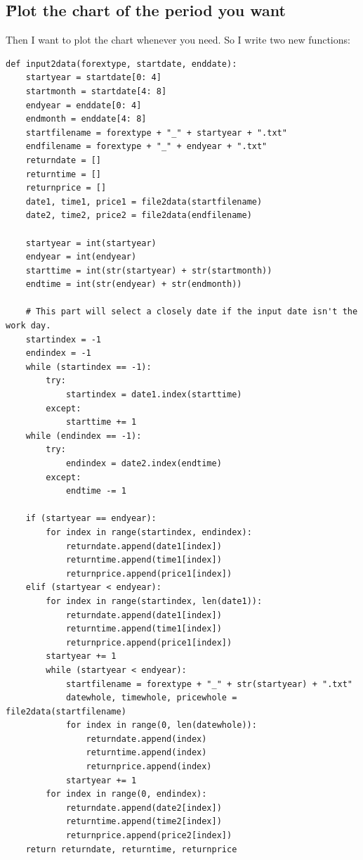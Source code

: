 \documentclass[12pt]{article}
\begin{document}
\subsection{\H Plot the chart of the period you want}
Then I want to plot the chart whenever you need. So I write two new functions:
\begin{lstlisting}
def input2data(forextype, startdate, enddate):
    startyear = startdate[0: 4]
    startmonth = startdate[4: 8]
    endyear = enddate[0: 4]
    endmonth = enddate[4: 8]
    startfilename = forextype + "_" + startyear + ".txt"
    endfilename = forextype + "_" + endyear + ".txt"
    returndate = []
    returntime = []
    returnprice = []
    date1, time1, price1 = file2data(startfilename)
    date2, time2, price2 = file2data(endfilename)

    startyear = int(startyear)
    endyear = int(endyear)
    starttime = int(str(startyear) + str(startmonth))
    endtime = int(str(endyear) + str(endmonth))

    # This part will select a closely date if the input date isn't the work day.
    startindex = -1
    endindex = -1
    while (startindex == -1):
        try:
            startindex = date1.index(starttime)
        except:
            starttime += 1
    while (endindex == -1):
        try:
            endindex = date2.index(endtime)
        except:
            endtime -= 1

    if (startyear == endyear):
        for index in range(startindex, endindex):
            returndate.append(date1[index])
            returntime.append(time1[index])
            returnprice.append(price1[index])
    elif (startyear < endyear):
        for index in range(startindex, len(date1)):
            returndate.append(date1[index])
            returntime.append(time1[index])
            returnprice.append(price1[index])
        startyear += 1
        while (startyear < endyear):
            startfilename = forextype + "_" + str(startyear) + ".txt"
            datewhole, timewhole, pricewhole = file2data(startfilename)
            for index in range(0, len(datewhole)):
                returndate.append(index)
                returntime.append(index)
                returnprice.append(index)
            startyear += 1
        for index in range(0, endindex):
            returndate.append(date2[index])
            returntime.append(time2[index])
            returnprice.append(price2[index])
    return returndate, returntime, returnprice
\end{lstlisting}
\end{document}
